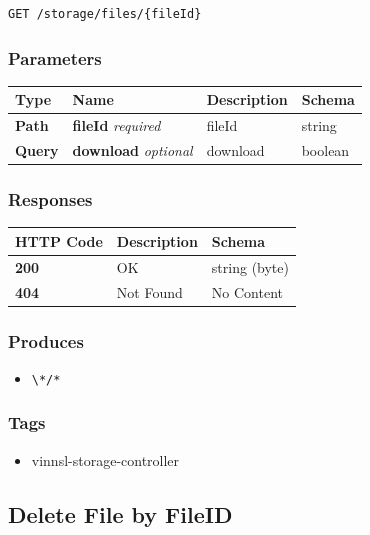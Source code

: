 \begin{verbatim}
GET /storage/files/{fileId}
\end{verbatim}

\subsubsection{Parameters}\label{parameters-15}

\begin{longtable}[]{@{}llll@{}}
\toprule
Type & Name & Description & Schema\tabularnewline
\midrule
\endhead
\textbf{Path} & \textbf{fileId} \emph{required} & fileId &
string\tabularnewline
\textbf{Query} & \textbf{download} \emph{optional} & download &
boolean\tabularnewline
\bottomrule
\end{longtable}

\subsubsection{Responses}\label{responses-18}

\begin{longtable}[]{@{}lll@{}}
\toprule
HTTP Code & Description & Schema\tabularnewline
\midrule
\endhead
\textbf{200} & OK & string (byte)\tabularnewline
\textbf{404} & Not Found & No Content\tabularnewline
\bottomrule
\end{longtable}

\subsubsection{Produces}\label{produces-18}

\begin{itemize}
\tightlist
\item
  \texttt{\textbackslash{}*/*}
\end{itemize}

\subsubsection{Tags}\label{tags-18}

\begin{itemize}
\tightlist
\item
  vinnsl-storage-controller
\end{itemize}

\subsection{Delete File by FileID}\label{delete-file-by-fileid}

